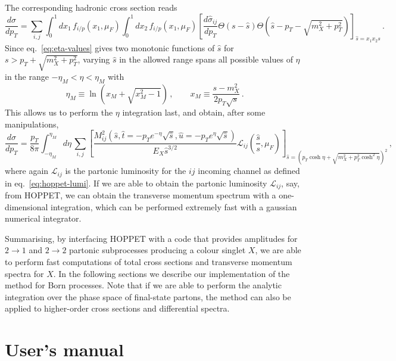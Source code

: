 \documentclass[12pt]{article}
\begin{document}
The corresponding hadronic cross section reads
\begin{equation}
\label{eq:hadronic-pt}
  \frac{d\sigma}{dp_T} = \sum_{i,j} \int_0^1 dx_1\, f_{i/p}(x_1,\mu_F)\int_0^1 dx_2 \, f_{i/p}(x_1,\mu_F) \left[\frac{d\hat \sigma_{ij}}{dp_T} \Theta(s-\hat s) \Theta\left(\hat s-p_T-\sqrt{m_X^2+p^2_T}\right)  \right]_{\hat s=x_1x_2 s}\,.
\end{equation}
Since eq.~\eqref{eq:eta-values} gives two monotonic functions of $\hat s$ for $s>p_T+\sqrt{m_X^2+p^2_T}$, varying $\hat s$ in the allowed range spans all possible values of $\eta$ in the range $-\eta_M<\eta<\eta_M$ with
\begin{equation}
\label{eq:eta-range}
\eta_M \equiv \ln(x_M + \sqrt{x_M^2-1})\,,\qquad  x_M\equiv\frac{s-m_X^2}{2 p_T \sqrt{s} }\,.
\end{equation}
This allows us to perform the  $\eta$ integration last, and obtain, after some
manipulations,
\begin{equation}
\label{eq:hadronic-pt-lumi}
  \frac{d\sigma}{dp_T} = \frac{p_T}{8 \pi}\int_{-\eta_M}^{\eta_M}\!d\eta\, \sum_{i,j}  \left[\frac{M^2_{ij}\left(\hat s,\hat t=-p_T e^{-\eta}\sqrt {\hat s}  ,\hat u =- p_T e^{\eta}\sqrt{\hat s}\right)}{E_X \hat s^{3/2}}\mathcal{L}_{ij}\left(\frac{\hat s}{s},\mu_F\right) \right]_{\hat s=\left(p_T\cosh\eta+\sqrt{m_X^2+p^2_T\cosh^2\eta}\right)^2}\,,
\end{equation}
where again $\mathcal{L}_{ij}$ is the partonic luminosity for the $ij$
incoming channel as defined in eq.~\eqref{eq:hoppet-lumi}. If we are
able to obtain the partonic luminosity $\mathcal{L}_{ij}$, say, from
\textsc{HOPPET}, we can obtain the transverse momentum spectrum with a
one-dimensional integration, which can be performed extremely fast
with a gaussian numerical integrator.

Summarising, by interfacing \textsc{HOPPET} with a code that provides
amplitudes for $2\to 1$ and $2\to 2$ partonic subprocesses producing a
colour singlet $X$, we are able to perform fast computations of total
cross sections and transverse momentum spectra for $X$. In the
following sections we describe our implementation of the method for
Born processes. Note that if we are able to perform the analytic
integration over the phase space of final-state partons, the method
can also be applied to higher-order cross sections and differential
spectra.

\section{User's manual}
\label{sec:manual} 
\end{document}
